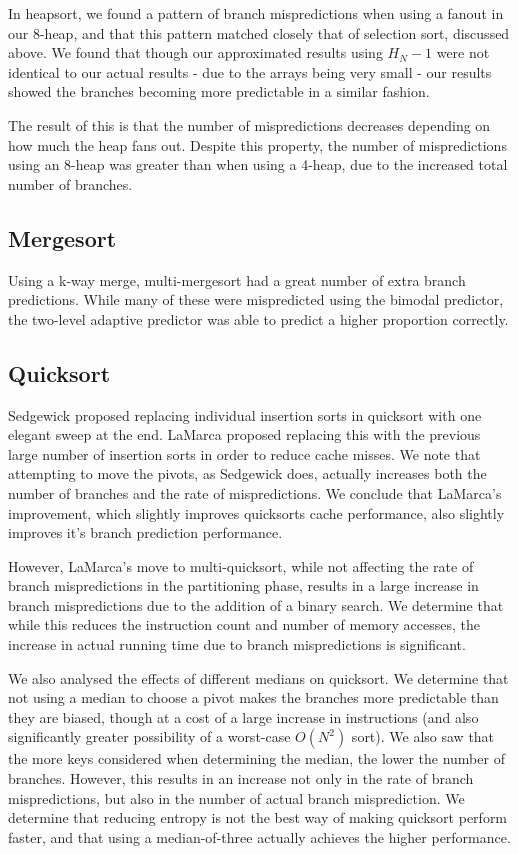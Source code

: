In heapsort, we found a pattern of branch mispredictions when using a fanout in
our 8-heap, and that this pattern matched closely that of selection sort,
discussed above. We found that though our approximated results using $H_N-1$
were not identical to our actual results - due to the arrays being very small -
our results showed the branches becoming more predictable in a similar fashion.

The result of this is that the number of mispredictions decreases depending on
how much the heap fans out. Despite this property, the number of mispredictions
using an 8-heap was greater than when using a 4-heap, due to the increased total
number of branches.


\subsection{Mergesort}

Using a k-way merge, multi-mergesort had a great number of extra branch
predictions. While many of these were mispredicted using the bimodal predictor,
the two-level adaptive predictor was able to predict a higher proportion
correctly.


\subsection{Quicksort}

Sedgewick proposed replacing individual insertion sorts in quicksort with one
elegant sweep at the end. LaMarca proposed replacing this with the previous
large number of insertion sorts in order to reduce cache misses. We note that
attempting to move the pivots, as Sedgewick does, actually increases both the
number of branches and the rate of mispredictions. We conclude that LaMarca's
improvement, which slightly improves quicksorts cache performance, also slightly
improves it's branch prediction performance.

However, LaMarca's move to multi-quicksort, while not affecting the rate of
branch mispredictions in the partitioning phase, results in a large increase in
branch mispredictions due to the addition of a binary search. We determine that
while this reduces the instruction count and number of memory accesses, the
increase in actual running time due to branch mispredictions is significant.

We also analysed the effects of different medians on quicksort. We determine that
not using a median to choose a pivot makes the branches more predictable than
they are biased, though at a cost of a large increase in instructions (and also
significantly greater possibility of a worst-case $O(N^2)$ sort). We also saw
that the more keys considered when determining the median, the lower the number
of branches. However, this results in an increase not only in the rate of branch
mispredictions, but also in the number of actual branch misprediction. We
determine that reducing entropy is not the best way of making quicksort perform
faster, and that using a median-of-three actually achieves the higher
performance.


